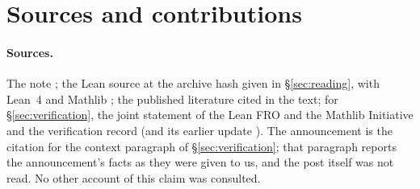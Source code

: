 \section{Sources and contributions}\label{sec:sources}

\paragraph{Sources.} The note \cite{remark}; the Lean source \cite{alpotree} at the archive hash given
in \S\ref{sec:reading}, with Lean~4 \cite{lean4} and Mathlib \cite{mathlib2020}; the published
literature cited in the text; for \S\ref{sec:verification}, the joint statement of the Lean FRO
and the Mathlib Initiative \cite{leanfro-mathlib} and the verification record \cite{sutherland-1255}
(and its earlier update \cite{sutherland}). The announcement \cite{vakil-masullo} is the citation for the context
paragraph of \S\ref{sec:verification}; that paragraph reports the announcement's facts as they were
given to us, and the post itself was not read. No other account of this claim was consulted.

